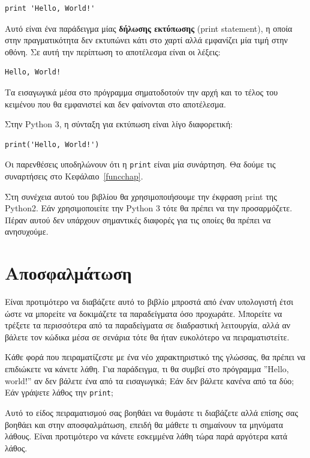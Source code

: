\documentclass[10pt]{book}
\begin{document}
\begin{verbatim}
print 'Hello, World!'
\end{verbatim}
%

Αυτό είναι ένα παράδειγμα μίας {\bf δήλωσης εκτύπωσης} (print statement),
η οποία στην πραγματικότητα δεν εκτυπώνει κάτι στο χαρτί αλλά εμφανίζει μία
τιμή στην οθόνη. Σε αυτή την περίπτωση το αποτέλεσμα είναι οι λέξεις:

\begin{verbatim}
Hello, World!
\end{verbatim}
%

Τα εισαγωγικά μέσα στο πρόγραμμα σηματοδοτούν την αρχή και το τέλος
του κειμένου που θα εμφανιστεί και δεν φαίνονται στο αποτέλεσμα.


Στην Python 3, η σύνταξη για εκτύπωση είναι λίγο διαφορετική:

\begin{verbatim}
print('Hello, World!')
\end{verbatim}
%
Οι παρενθέσεις υποδηλώνουν ότι η {\tt print} είναι μία
συνάρτηση. Θα δούμε τις συναρτήσεις στο Κεφάλαιο~\ref{funcchap}.

  

Στη συνέχεια αυτού του βιβλίου θα χρησιμοποιήσουμε την έκφραση print της Python2. Εάν χρησιμοποιείτε την Python 3 τότε θα πρέπει να την προσαρμόζετε.  
Πέραν αυτού δεν υπάρχουν σημαντικές διαφορές για τις οποίες θα
πρέπει να ανησυχούμε.


\section{Αποσφαλμάτωση}
Είναι προτιμότερο να διαβάζετε αυτό το βιβλίο μπροστά από έναν υπολογιστή
έτσι ώστε να μπορείτε να δοκιμάζετε τα παραδείγματα όσο προχωράτε. Μπορείτε
να τρέξετε τα περισσότερα από τα παραδείγματα σε διαδραστική λειτουργία,
αλλά αν βάλετε τον κώδικα μέσα σε σενάρια τότε θα ήταν ευκολότερο να πειραματιστείτε.

Κάθε φορά που πειραματίζεστε με ένα νέο χαρακτηριστικό της γλώσσας, θα πρέπει να επιδιώκετε να κάνετε λάθη. Για παράδειγμα, τι θα συμβεί στο πρόγραμμα ''Hello, world!'' αν δεν βάλετε ένα από τα εισαγωγικά; Εάν δεν βάλετε κανένα από τα δύο; Εάν γράψετε λάθος την {\tt print};

Αυτό το είδος πειραματισμού σας βοηθάει να θυμάστε τι διαβάζετε αλλά επίσης
σας βοηθάει και στην αποσφαλμάτωση, επειδή θα μάθετε τι σημαίνουν τα μηνύματα
λάθους. Είναι προτιμότερο να κάνετε εσκεμμένα λάθη τώρα παρά αργότερα κατά
λάθος.
\end{document}
